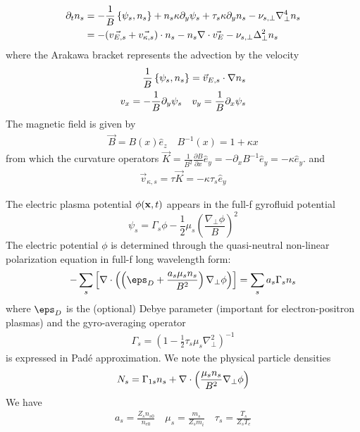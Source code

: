 \begin{align} \label{eq:density}
    \partial_t {n_s}   &=  - \frac{1}{B} \left \{ \psi_s, {n_s}  \right \}
  +  {n_s}  \kappa \partial_y \psi_s
  + \tau_s \kappa \partial_y {n_s} 
  -\nu_{s,\perp} \nabla_{\perp}^4 {n_s}  \\
  &= -(\vec{ v_{E,s}} + \vec{ v_{\kappa,s}} )\cdot {n_s}   - {n_s}  \nabla\cdot \vec {v_E} -\nu_{s,\perp} \Delta_\perp^2 {n_s} 
\end{align}
where the Arakawa bracket represents the advection by the \ExB velocity
\begin{align}
    \frac{1}{B} \left \{ \psi_s, {n_s}  \right \} = \vec v_{E,s} \cdot \nabla {n_s}  \\
v_x = -\frac{1}{B} \partial_y \psi_s \quad v_y = \frac{1}{B}\partial_x \psi_s
\end{align}
The magnetic field is given by
\begin{align}
    \vec B=  B(x) \hat e_z \quad
    B^{-1}(x)= 1+\kappa x
\end{align}
from which the curvature operators $\vec K = \frac{1}{B^2}\frac{\partial B}{\partial x}\hat e_y = -\partial_x B^{-1}\hat e_y = -\kappa \hat e_y$.
and
\begin{align}
\vec v_{\kappa,s} = \tau \vec K = -\kappa\tau_s \hat e_y
\end{align}

The electric plasma potential $\phi({\bf x},t)$ appears in the full-f
gyrofluid potential
\begin{equation}
    \psi_s  =  \Gamma_s \phi - \frac{1}{2} \mu_s \left(
    \frac{\nabla_{\perp} \phi}{B} \right)^{2}
\end{equation}
The electric potential $\phi$ is determined through the quasi-neutral non-linear
polarization equation in full-f long wavelength form:
\begin{equation}
    -\sum_s \left[\nabla \cdot \left(  \left(\eps_D +  \frac{a_s \mu_s \ns}{ B^2}\right)
    \nabla_{\perp} \phi \right)  \right] =  \sum_s a_s \Gamma_s \ns 
  \label{eq:polarization}
\end{equation}
where $\eps_D$ is the (optional) Debye parameter (important for electron-positron plasmas)
and the gyro-averaging operator
\begin{align}
    \Gamma_s  =  \left( 1- \frac{1}{2} \tau_s \mu_s \nabla_{\perp}^2 \right)^{-1}
\end{align}
is expressed in Pad\'e approximation.
We note the physical particle densities
\begin{align}
    {N_s}  = \Gamma_{1s}{n_s}  + \nabla\cdot\left(\frac{ \mu_s {n_s} }{ B^2}
    \nabla_{\perp} \phi \right)
\end{align}
We have
\begin{align}
    a_s = \frac{Z_s n_{s0}}{n_{e0}}  \quad \mu_s = \frac{m_s}{Z_s m_i} \quad \tau_s = \frac{T_s}{Z_s T_e}
\end{align}


